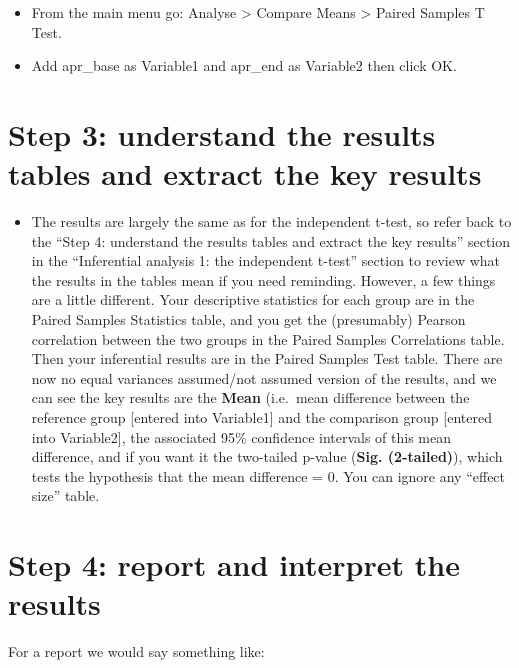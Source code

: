 \documentclass[
]{book}
\providecommand{\tightlist}{%
  \setlength{\itemsep}{0pt}\setlength{\parskip}{0pt}}
\begin{document}
\begin{itemize}
\item
  From the main menu go: Analyse \textgreater{} Compare Means \textgreater{} Paired Samples T Test.
\item
  Add apr\_base as Variable1 and apr\_end as Variable2 then click OK.
\end{itemize}

\hypertarget{step-3-understand-the-results-tables-and-extract-the-key-results}{%
\section{Step 3: understand the results tables and extract the key results}\label{step-3-understand-the-results-tables-and-extract-the-key-results}}

\begin{itemize}
\tightlist
\item
  The results are largely the same as for the independent t-test, so refer back to the ``Step 4: understand the results tables and extract the key results'' section in the ``Inferential analysis 1: the independent t-test'' section to review what the results in the tables mean if you need reminding. However, a few things are a little different. Your descriptive statistics for each group are in the Paired Samples Statistics table, and you get the (presumably) Pearson correlation between the two groups in the Paired Samples Correlations table. Then your inferential results are in the Paired Samples Test table. There are now no equal variances assumed/not assumed version of the results, and we can see the key results are the \textbf{Mean} (i.e.~mean difference between the reference group {[}entered into Variable1{]} and the comparison group {[}entered into Variable2{]}, the associated 95\% confidence intervals of this mean difference, and if you want it the two-tailed p-value (\textbf{Sig. (2-tailed)}), which tests the hypothesis that the mean difference = 0. You can ignore any ``effect size'' table.
\end{itemize}

\hypertarget{step-4-report-and-interpret-the-results}{%
\section{Step 4: report and interpret the results}\label{step-4-report-and-interpret-the-results}}

For a report we would say something like:
\end{document}
